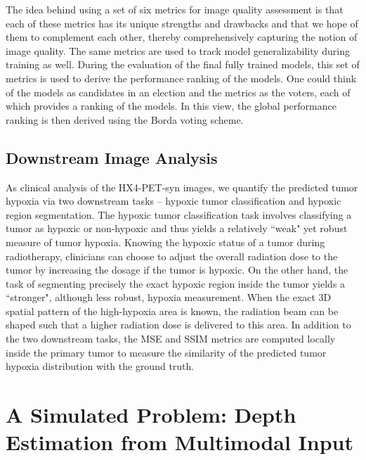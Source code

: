The idea behind using a set of six metrics for image quality assessment is that each of these metrics has its unique strengths and drawbacks and that we hope of them to complement each other, thereby comprehensively capturing the notion of image quality. The same metrics are used to track model generalizability during training as well. During the evaluation of the final fully trained models, this set of metrics is used to derive the performance ranking of the models. One could think of the models as candidates in an election and the metrics as the voters, each of which provides a ranking of the models. In this view, the global performance ranking is then derived using the Borda voting scheme.


\subsection{Downstream Image Analysis}
As clinical analysis of the HX4-PET-syn images, we quantify the predicted tumor hypoxia via two downstream tasks -- hypoxic tumor classification and hypoxic region segmentation. The hypoxic tumor classification task involves classifying a tumor as hypoxic or non-hypoxic and thus yields a relatively ``weak" yet robust measure of tumor hypoxia. Knowing the hypoxic status of a tumor during radiotherapy, clinicians can choose to adjust the overall radiation dose to the tumor by increasing the dosage if the tumor is hypoxic. On the other hand, the task of segmenting precisely the exact hypoxic region inside the tumor yields a ``stronger", although less robust, hypoxia measurement. When the exact 3D spatial pattern of the high-hypoxia area is known, the radiation beam can be shaped such that a higher radiation dose is delivered to this area. In addition to the two downstream tasks, the MSE and SSIM metrics are computed locally inside the primary tumor to measure the similarity of the predicted tumor hypoxia distribution with the ground truth. 



\section{A Simulated Problem: Depth Estimation from Multimodal Input}
\label{ClearGrasp_Depth_Estimation}

